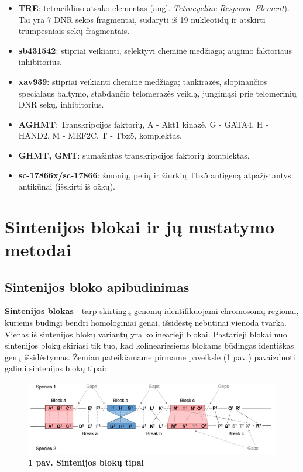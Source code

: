 \documentclass[12pt]{article}
\begin{document}
\begin{itemize}
    \item \textbf{TRE}: tetraciklino atsako elementas (angl. \emph{Tetracycline
          Response Element}). Tai yra 7 DNR sekos fragmentai, sudaryti iš 19
          nukleotidų ir atskirti trumpesniais sekų fragmentais.
    \item \textbf{sb431542}: stipriai veikianti, selektyvi cheminė medžiaga;
          augimo faktoriaus inhibitorius.
    \item \textbf{xav939}: stipriai veikianti cheminė medžiaga; tankirazės,
          slopinančios specialaus baltymo, stabdančio telomerazės veiklą,
          jungimąsi prie telomerinių DNR sekų, inhibitorius.
    \item \textbf{AGHMT}: Transkripcijos faktorių, A - Akt1 kinazė, G - GATA4,
          H - HAND2, M - MEF2C, T - Tbx5, komplektas.
    \item \textbf{GHMT, GMT}: sumažintas transkripcijos faktorių
          komplektas.
    \item \textbf{sc-17866x/sc-17866}: žmonių, pelių ir žiurkių Tbx5 antigeną
          atpažįstantys antikūnai (išskirti iš ožkų).
\end{itemize}


\section{Sintenijos blokai ir jų nustatymo metodai}
\subsection{Sintenijos bloko apibūdinimas}
\textbf{Sintenijos blokas} - tarp skirtingų genomų identifikuojami chromosomų
regionai, kuriems būdingi bendri homologiniai genai, išsidėstę nebūtinai vienoda
tvarka. Vienas iš sintenijos blokų variantų yra kolinearieji blokai.
Pastarieji blokai nuo sintenijos blokų skiriasi tik tuo, kad kolineariesiems
blokams būdingas identiškas genų išsidėstymas. Žemiau pateikiamame pirmame
paveiksle (1 pav.) pavaizduoti galimi sintenijos blokų tipai\cite{ARTICLE3}:

\begin{figure}[htb]
    \begin{center}
        \includegraphics[width=0.7\linewidth]{../Figures/Synteny_block_definition.png}
        \vspace{-2\baselineskip}
        \caption*{\small\textbf{1 pav. Sintenijos blokų tipai}}
        \label{fig:1}
    \end{center}
\end{figure}
\end{document}
